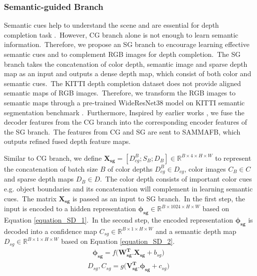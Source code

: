 \documentclass{ieeeaccess}
\begin{document}
\subsubsection{Semantic-guided Branch}
Semantic cues help to understand the scene and are essential for depth completion task \cite{semantic}.~However, CG branch alone is not enough to learn semantic information.~Therefore, we propose an SG branch to encourage learning effective semantic cues and to complement RGB images for depth completion.~The SG branch takes the concatenation of color depth, semantic image and sparse depth map as an input and outputs a dense depth map, which consist of both color and semantic cues.~The KITTI depth completion dataset does not provide aligned semantic maps of RGB images.~Therefore, we transform the RGB images to semantic maps through a pre-trained WideResNet38 \cite{wu2016wider} model on KITTI semantic segmentation benchmark \cite{Alhaija2018IJCV}.~Furthermore, Inspired by earlier works \cite{tang2020learning,hu2020PENet}, we fuse the decoder features from the CG branch into the corresponding encoder features of the SG branch.~The features from CG and SG are sent to SAMMAFB, which outputs refined fused depth feature maps.





Similar to CG branch, we define $ \mathbf{X_{sg}}=\left[D_{cg}^B;S_{B};D_{B} \right] \in \mathbb{R}^{B \times 4 \times H \times W}$ to represent the concatenation of batch size $B$ of color depths $D_{cg}^B \in D_{cg}$, color images $C_B \in C$ and sparse depth maps $D_B \in D$.~The color depth consists of important color cues e.g. object boundaries and its concatenation will complement in learning semantic cues.~The matrix $\mathbf{X_{sg}}$ is passed as an input to SG branch.~In the first step, the input is encoded to a hidden representation $\mathbf{\phi_{sg}}  \in \mathbb{R}^{B \times 1024 \times H \times W}$ based on Equation \ref{equation_SD_1}.~In the second step, the encoded representation $\mathbf{\phi_{sg}}$ is decoded into a confidence map $C_{sg}  \in \mathbb{R}^{B \times 1 \times H \times W}$ and a semantic depth map $D_{sg}  \in \mathbb{R}^{B \times 1 \times H \times W}$ based on Equation \ref{equation_SD_2}. 
\begin{equation}
    \begin{aligned}
            \mathbf{\phi_{sg}} =   f\mathbf{(W_{sg}^T.X_{sg}} + b_{sg})
    \end{aligned}
    \label{equation_SD_1}
\end{equation}
\begin{equation}
    \begin{aligned}
            D_{sg}, C_{sg} =   g\mathbf{(V_{sg}^T.\phi_{sg}} + c_{sg})
    \end{aligned}
    \label{equation_SD_2}
\end{equation}
\end{document}
